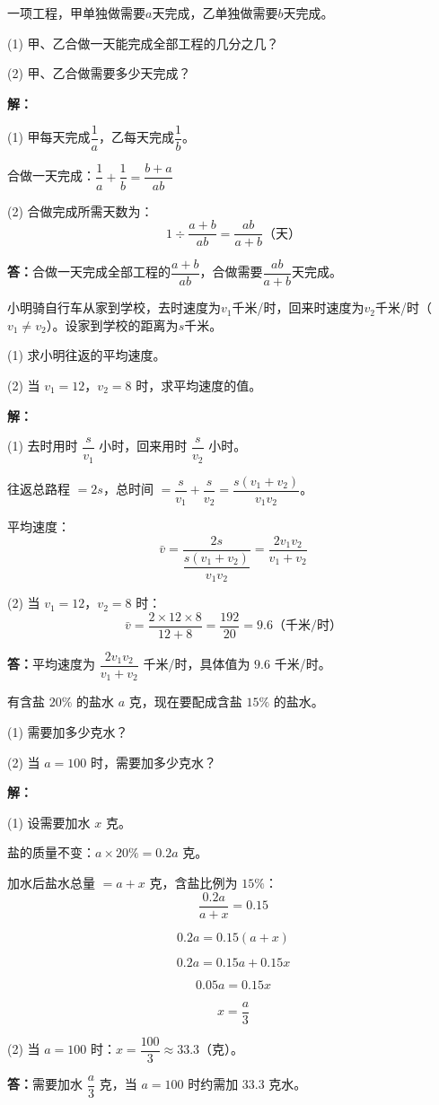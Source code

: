 \documentclass[12pt, a4paper]{ctexart}
\begin{document}
\begin{appbox}[【应用1】工程问题]
一项工程，甲单独做需要$a$天完成，乙单独做需要$b$天完成。

(1) 甲、乙合做一天能完成全部工程的几分之几？

(2) 甲、乙合做需要多少天完成？

\bigskip
\textbf{解：}

(1) 甲每天完成$\dfrac{1}{a}$，乙每天完成$\dfrac{1}{b}$。

合做一天完成：$\dfrac{1}{a} + \dfrac{1}{b} = \dfrac{b+a}{ab}$

(2) 合做完成所需天数为：
\[
1 \div \frac{a+b}{ab} = \frac{ab}{a+b} \text{（天）}
\]

\textbf{答：}合做一天完成全部工程的$\dfrac{a+b}{ab}$，合做需要$\dfrac{ab}{a+b}$天完成。
\end{appbox}

\begin{appbox}[【应用2】行程问题]
小明骑自行车从家到学校，去时速度为$v_1$千米/时，回来时速度为$v_2$千米/时（$v_1 \neq v_2$）。设家到学校的距离为$s$千米。

(1) 求小明往返的平均速度。

(2) 当 $v_1 = 12$，$v_2 = 8$ 时，求平均速度的值。

\bigskip
\textbf{解：}

(1) 去时用时 $\dfrac{s}{v_1}$ 小时，回来用时 $\dfrac{s}{v_2}$ 小时。

往返总路程 $= 2s$，总时间 $= \dfrac{s}{v_1} + \dfrac{s}{v_2} = \dfrac{s(v_1+v_2)}{v_1 v_2}$。

平均速度：
\[
\bar{v} = \frac{2s}{\dfrac{s(v_1+v_2)}{v_1 v_2}} = \frac{2v_1 v_2}{v_1 + v_2}
\]

(2) 当 $v_1 = 12$，$v_2 = 8$ 时：
\[
\bar{v} = \frac{2 \times 12 \times 8}{12 + 8} = \frac{192}{20} = 9.6 \text{（千米/时）}
\]

\textbf{答：}平均速度为 $\dfrac{2v_1 v_2}{v_1 + v_2}$ 千米/时，具体值为 $9.6$ 千米/时。
\end{appbox}

\begin{appbox}[【应用3】浓度问题]
有含盐 $20\%$ 的盐水 $a$ 克，现在要配成含盐 $15\%$ 的盐水。

(1) 需要加多少克水？

(2) 当 $a = 100$ 时，需要加多少克水？

\bigskip
\textbf{解：}

(1) 设需要加水 $x$ 克。

盐的质量不变：$a \times 20\% = 0.2a$ 克。

加水后盐水总量 $= a + x$ 克，含盐比例为 $15\%$：
\[
\frac{0.2a}{a + x} = 0.15
\]

\[
0.2a = 0.15(a + x)
\]

\[
0.2a = 0.15a + 0.15x
\]

\[
0.05a = 0.15x
\]

\[
x = \frac{a}{3}
\]

(2) 当 $a = 100$ 时：$x = \dfrac{100}{3} \approx 33.3$（克）。

\textbf{答：}需要加水 $\dfrac{a}{3}$ 克，当 $a=100$ 时约需加 $33.3$ 克水。
\end{appbox}
\end{document}
